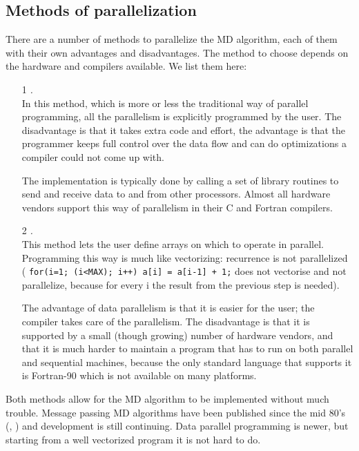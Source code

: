 \subsection{Methods of parallelization}
There are a number of methods to parallelize the MD algorithm, each of
them with their own advantages and disadvantages. The method to 
choose depends on the hardware and compilers available.
We list them here:
\begin{enumerate}
\item[1]        {\em {}.}\\
                In this method, which is more or less the traditional
                way of parallel programming, all the parallelism is
                explicitly programmed by the user. The disadvantage
                is that it takes extra code and effort, the advantage
                is that the programmer keeps full control over the data
                flow and can do optimizations a compiler could not come 
                up with. 

                The implementation is typically done by calling a set of 
                library routines to send and receive data to and from 
                other processors. Almost all hardware vendors support 
                this way of
                parallelism in their C and Fortran compilers.
                
\item[2]        {\em {}.}\\
                This method lets the user define arrays on which to
                operate in parallel. Programming this way is much
                like vectorizing: recurrence is not parallelized
                ({\eg} {\tt for(i=1; (i<MAX); i++) a[i] = a[i-1] + 1;}
                does not vectorise and not parallelize, because for
                every i the result from the previous step is needed).

                The advantage of data parallelism is that it is
                easier for the user; the compiler takes care of the
                parallelism. The disadvantage is that it is supported
                by a small (though growing) number of hardware vendors,
                and that it is much harder to maintain a program that has to
                run on both parallel and sequential machines, because
                the only standard language that supports it is Fortran-90
                which is not available on many platforms.
\end{enumerate}
Both methods allow for the MD algorithm to be implemented without much
trouble. Message passing MD algorithms have been published
since the mid 80's (\cite{Fincham87}, \cite{Raine89}) 
and development is still continuing. 
Data parallel programming is newer,
but starting from a well vectorized program it is not hard to do.

